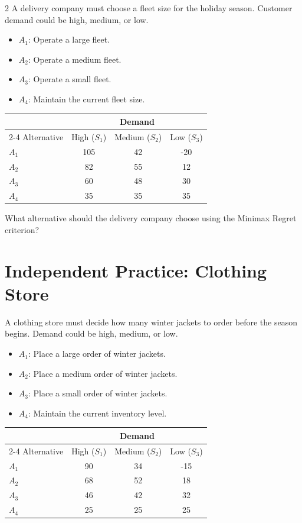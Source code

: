 \begin{multicols}{2}
	A delivery company must choose a fleet size for the holiday season.
	Customer demand could be high, medium, or low.
	\begin{itemize}
		\item $A_1$: Operate a large fleet.
		\item $A_2$: Operate a medium fleet.
		\item $A_3$: Operate a small fleet.
		\item $A_4$: Maintain the current fleet size.
	\end{itemize}
	\begin{center}
		\renewcommand{\arraystretch}{1.3}
		\small
		\begin{tabular}{lccc}
			\toprule
			& \multicolumn{3}{c}{Demand} \\
			\cmidrule(lr){2-4}
			Alternative & High ($S_1$) & Medium ($S_2$) & Low ($S_3$) \\
			\midrule
			$A_1$ & 105 & 42 & -20 \\
			$A_2$ & 82 & 55 & 12 \\
			$A_3$ & 60 & 48 & 30 \\
			$A_4$ & 35 & 35 & 35 \\
			\bottomrule
		\end{tabular}
	\end{center}
	
	What alternative should the delivery company choose using the Minimax Regret criterion?
	
	
	\section{Independent Practice: Clothing Store}
	
	A clothing store must decide how many winter jackets to order before the season begins.
	Demand could be high, medium, or low.
	\begin{itemize}
		\item $A_1$: Place a large order of winter jackets.
		\item $A_2$: Place a medium order of winter jackets.
		\item $A_3$: Place a small order of winter jackets.
		\item $A_4$: Maintain the current inventory level.
	\end{itemize}
	\begin{center}
		\renewcommand{\arraystretch}{1.3}
		\small
		\begin{tabular}{lccc}
			\toprule
			& \multicolumn{3}{c}{Demand} \\
			\cmidrule(lr){2-4}
			Alternative & High ($S_1$) & Medium ($S_2$) & Low ($S_3$) \\
			\midrule
			$A_1$ & 90 & 34 & -15 \\
			$A_2$ & 68 & 52 & 18 \\
			$A_3$ & 46 & 42 & 32 \\
			$A_4$ & 25 & 25 & 25 \\
			\bottomrule
		\end{tabular}
	\end{center}
	

\end{multicols}
